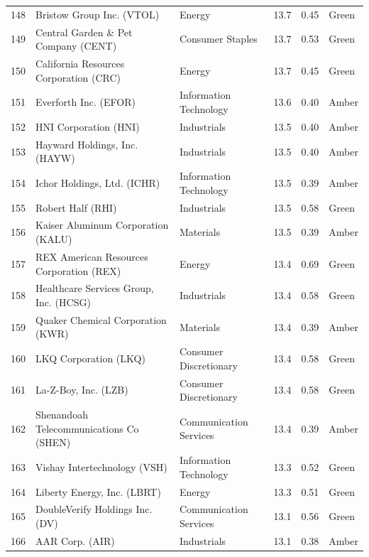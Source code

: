 \documentclass[11pt,a4paper]{article}
\begin{document}
{\begin{longtable}{r p{4.6cm} p{3cm} r r l}
148 & Bristow Group Inc. (VTOL) & Energy & 13.7 & 0.45 & \cellcolor[HTML]{C6EFCE}Green \\
149 & Central Garden \& Pet Company (CENT) & Consumer Staples & 13.7 & 0.53 & \cellcolor[HTML]{C6EFCE}Green \\
150 & California Resources Corporation (CRC) & Energy & 13.7 & 0.45 & \cellcolor[HTML]{C6EFCE}Green \\
151 & Everforth Inc. (EFOR) & Information Technology & 13.6 & 0.40 & \cellcolor[HTML]{FFEB9C}Amber \\
152 & HNI Corporation (HNI) & Industrials & 13.5 & 0.40 & \cellcolor[HTML]{FFEB9C}Amber \\
153 & Hayward Holdings, Inc. (HAYW) & Industrials & 13.5 & 0.40 & \cellcolor[HTML]{FFEB9C}Amber \\
154 & Ichor Holdings, Ltd. (ICHR) & Information Technology & 13.5 & 0.39 & \cellcolor[HTML]{FFEB9C}Amber \\
155 & Robert Half (RHI) & Industrials & 13.5 & 0.58 & \cellcolor[HTML]{C6EFCE}Green \\
156 & Kaiser Aluminum Corporation (KALU) & Materials & 13.5 & 0.39 & \cellcolor[HTML]{FFEB9C}Amber \\
157 & REX American Resources Corporation (REX) & Energy & 13.4 & 0.69 & \cellcolor[HTML]{C6EFCE}Green \\
158 & Healthcare Services Group, Inc. (HCSG) & Industrials & 13.4 & 0.58 & \cellcolor[HTML]{C6EFCE}Green \\
159 & Quaker Chemical Corporation (KWR) & Materials & 13.4 & 0.39 & \cellcolor[HTML]{FFEB9C}Amber \\
160 & LKQ Corporation (LKQ) & Consumer Discretionary & 13.4 & 0.58 & \cellcolor[HTML]{C6EFCE}Green \\
161 & La-Z-Boy, Inc. (LZB) & Consumer Discretionary & 13.4 & 0.58 & \cellcolor[HTML]{C6EFCE}Green \\
162 & Shenandoah Telecommunications Co (SHEN) & Communication Services & 13.4 & 0.39 & \cellcolor[HTML]{FFEB9C}Amber \\
163 & Vishay Intertechnology (VSH) & Information Technology & 13.3 & 0.52 & \cellcolor[HTML]{C6EFCE}Green \\
164 & Liberty Energy, Inc. (LBRT) & Energy & 13.3 & 0.51 & \cellcolor[HTML]{C6EFCE}Green \\
165 & DoubleVerify Holdings Inc. (DV) & Communication Services & 13.1 & 0.56 & \cellcolor[HTML]{C6EFCE}Green \\
166 & AAR Corp. (AIR) & Industrials & 13.1 & 0.38 & \cellcolor[HTML]{FFEB9C}Amber \\

\end{longtable}}
\end{document}
